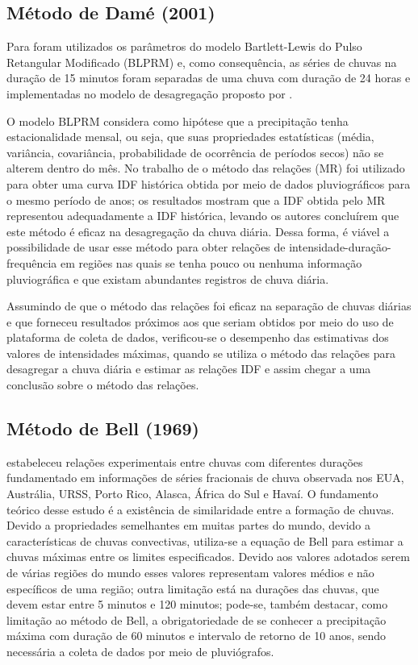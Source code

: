 \subsection{Método de Damé (2001)}

Para  foram utilizados os parâmetros do modelo Bartlett-Lewis do Pulso Retangular Modificado (BLPRM) \cite{iturbe} e, como consequência, as séries de chuvas na duração de 15 minutos foram separadas de uma chuva com duração de 24 horas e implementadas no modelo de desagregação proposto por .

O modelo BLPRM considera como hipótese que a precipitação tenha estacionalidade mensal, ou seja, que suas propriedades estatísticas (média, variância, covariância, probabilidade de ocorrência de períodos secos) não se alterem dentro do mês. No trabalho de \cite{chuva-diaria} o método das relações (MR) foi utilizado para obter uma curva IDF histórica obtida por meio de dados pluviográficos para o mesmo período de anos; os resultados mostram que a IDF obtida pelo MR representou adequadamente a IDF histórica, levando os autores concluírem que este método é eficaz na desagregação da chuva diária. Dessa forma, é viável a possibilidade de usar esse método para obter relações de intensidade-duração-frequência em regiões nas quais se tenha pouco ou nenhuma informação pluviográfica e que existam abundantes registros de chuva diária.

Assumindo de que o método das relações foi eficaz na separação de chuvas diárias e que forneceu resultados próximos aos que seriam obtidos por meio do uso de plataforma de coleta de dados, verificou-se o desempenho das estimativas dos valores de intensidades máximas, quando se utiliza o método das relações para desagregar a chuva diária e estimar as relações IDF e assim chegar a uma conclusão sobre o método das relações.

\subsection{Método de Bell (1969)}

 estabeleceu relações experimentais entre chuvas com diferentes durações fundamentado em informações de séries fracionais de chuva observada nos EUA, Austrália, URSS, Porto Rico, Alasca, África do Sul e Havaí. O fundamento teórico desse estudo é a existência de similaridade entre a formação de chuvas. Devido a propriedades semelhantes em muitas partes do mundo, devido a características de chuvas convectivas,  utiliza-se a equação de Bell para estimar a chuvas máximas entre os limites especificados. Devido aos valores adotados serem de várias regiões do mundo esses valores representam valores médios e não específicos de uma região; outra limitação está na durações das chuvas, que devem estar entre 5 minutos e 120 minutos; pode-se, também destacar, como limitação ao método de Bell, a obrigatoriedade de se conhecer a precipitação máxima com duração de 60 minutos e intervalo de retorno de 10 anos, sendo necessária a coleta de dados por meio de pluviógrafos.

